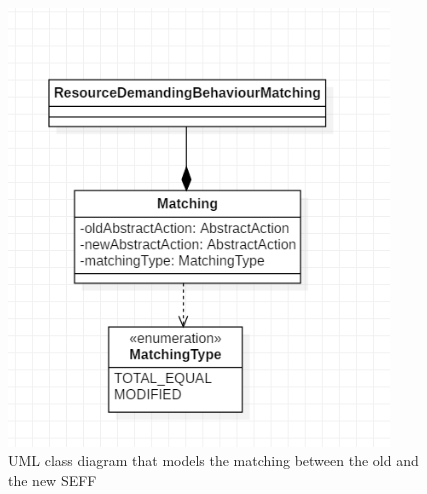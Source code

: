 \begin{figure}[h]
\centering
\includegraphics[width=0.9\textwidth]{figures/seffmachting}
\caption{UML class diagram that models the matching between the old and the new SEFF}
\label{fig:seffmachting}
\end{figure}



